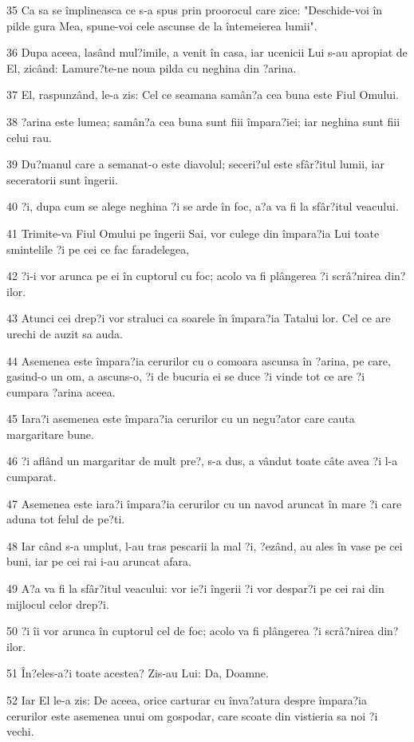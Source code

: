\par 35 Ca sa se împlineasca ce s-a spus prin proorocul care zice: "Deschide-voi în pilde gura Mea, spune-voi cele ascunse de la întemeierea lumii".
\par 36 Dupa aceea, lasând mul?imile, a venit în casa, iar ucenicii Lui s-au apropiat de El, zicând: Lamure?te-ne noua pilda cu neghina din ?arina.
\par 37 El, raspunzând, le-a zis: Cel ce seamana samân?a cea buna este Fiul Omului.
\par 38 ?arina este lumea; samân?a cea buna sunt fiii împara?iei; iar neghina sunt fiii celui rau.
\par 39 Du?manul care a semanat-o este diavolul; seceri?ul este sfâr?itul lumii, iar seceratorii sunt îngerii.
\par 40 ?i, dupa cum se alege neghina ?i se arde în foc, a?a va fi la sfâr?itul veacului.
\par 41 Trimite-va Fiul Omului pe îngerii Sai, vor culege din împara?ia Lui toate smintelile ?i pe cei ce fac faradelegea,
\par 42 ?i-i vor arunca pe ei în cuptorul cu foc; acolo va fi plângerea ?i scrâ?nirea din?ilor.
\par 43 Atunci cei drep?i vor straluci ca soarele în împara?ia Tatalui lor. Cel ce are urechi de auzit sa auda.
\par 44 Asemenea este împara?ia cerurilor cu o comoara ascunsa în ?arina, pe care, gasind-o un om, a ascuns-o, ?i de bucuria ei se duce ?i vinde tot ce are ?i cumpara ?arina aceea.
\par 45 Iara?i asemenea este împara?ia cerurilor cu un negu?ator care cauta margaritare bune.
\par 46 ?i aflând un margaritar de mult pre?, s-a dus, a vândut toate câte avea ?i l-a cumparat.
\par 47 Asemenea este iara?i împara?ia cerurilor cu un navod aruncat în mare ?i care aduna tot felul de pe?ti.
\par 48 Iar când s-a umplut, l-au tras pescarii la mal ?i, ?ezând, au ales în vase pe cei buni, iar pe cei rai i-au aruncat afara.
\par 49 A?a va fi la sfâr?itul veacului: vor ie?i îngerii ?i vor despar?i pe cei rai din mijlocul celor drep?i.
\par 50 ?i îi vor arunca în cuptorul cel de foc; acolo va fi plângerea ?i scrâ?nirea din?ilor.
\par 51 În?eles-a?i toate acestea? Zis-au Lui: Da, Doamne.
\par 52 Iar El le-a zis: De aceea, orice carturar cu înva?atura despre împara?ia cerurilor este asemenea unui om gospodar, care scoate din vistieria sa noi ?i vechi.
